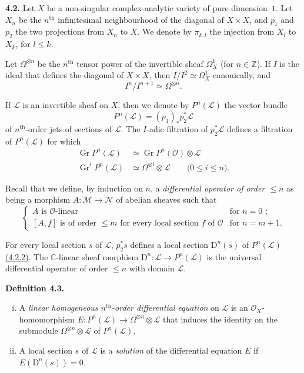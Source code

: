 \documentclass{report}
\newenvironment{rmenv}[1]
  {\phantomsection\par\medskip\noindent\textbf{#1.}\rmfamily}
  {\medskip}
\newcommand{\scr}[1]{{\mathscr{#1}}}
\renewcommand{\cal}[1]{{\mathcal{#1}}}
\newcommand{\CC}{\mathbb{C}}
\newcommand{\ZZ}{\mathbb{Z}}
\newcommand{\DD}{\mathrm{D}}
\renewcommand{\leq}{\leqslant}
\DeclareMathOperator{\Gr}{Gr}
\newcommand{\oldpage}[1]{\marginpar{\footnotesize$\Big\vert$ \textit{p.~#1}}}
\begin{document}
\begin{rmenv}{4.2}
\label{I.4.2}
  Let $X$ be a non-singular complex-analytic variety of pure dimension~$1$.
  Let $X_n$ be the $n^\mathrm{th}$ infinitesimal neighbourhood of the diagonal of $X\times X$, and $p_1$ and $p_2$ the two projections from $X_n$ to $X$.
  We denote by $\pi_{k,l}$ the injection from $X_l$ to
\oldpage{24}
  $X_k$, for $l\leq k$.

  Let $\Omega^{\otimes n}$ be the $n^\mathrm{th}$ tensor power of the invertible sheaf $\Omega_X^1$ (for $n\in\ZZ$).
  If $I$ is the ideal that defines the diagonal of $X\times X$, then $I/I^2\simeq\Omega_X^1$ canonically, and
  \[
  \label{I.4.2.1}
    I^n/I^{n+1} \simeq \Omega^{\otimes n}.
  \tag{4.2.1}
  \]

  If $\scr{L}$ is an invertible sheaf on $X$, then we denote by $P^n(\scr{L})$ the vector bundle
  \[
  \label{I.4.2.2}
    P^n(\scr{L}) = (p_1)_*p_2^*\scr{L}
  \tag{4.2.2}
  \]
  of $n^\mathrm{th}$-order jets of sections of $\scr{L}$.
  The $I$-adic filtration of $p_2^*\scr{L}$ defines a filtration of $P^n(\scr{L})$ for which
  \[
  \label{I.4.2.3}
    \begin{aligned}
      \Gr P^n(\scr{L}) &\simeq \Gr P^n(\cal{O})\otimes\scr{L}
    \\\Gr^i P^n(\scr{L}) &\simeq \Omega^{\otimes i}\otimes\scr{L} \qquad\mbox{($0\leq i\leq n$).}
    \end{aligned}
  \tag{4.2.3}
  \]

  Recall that we define, by induction on $n$, a \emph{differential operator of order $\leq n$} as being a morphism $A\colon\scr{M}\to\scr{N}$ of abelian sheaves such that
  \[
    \begin{cases}
      \mbox{$A$ is $\cal{O}$-linear} & \mbox{for $n=0$ ;}
    \\\mbox{$[A,f]$ is of order $\leq m$ for every local section $f$ of $\cal{O}$} & \mbox{for $n=m+1$.}
    \end{cases}
  \]

  For every local section $s$ of $\scr{L}$, $p_2^*s$ defines a local section $\DD^n(s)$ of $P^n(\scr{L})$ \hyperref[I.4.2.2]{(4.2.2)}.
  The $\CC$-linear sheaf morphism $\DD^n\colon\scr{L}\to P^n(\scr{L})$ is the universal differential operator of order $\leq n$ with domain $\scr{L}$.
\end{rmenv}

\begin{rmenv}{Definition 4.3}
\label{I.4.3}
  \begin{enumerate}[(i)]
    \item A \emph{linear homogeneous $n^\mathrm{th}$-order differential equation} on $\scr{L}$ is an $\cal{O}_X$-homomorphism $E\colon P^n(\scr{L})\to\Omega^{\otimes n}\otimes\scr{L}$ that induces the identity on the submodule $\Omega^{\otimes n}\otimes\scr{L}$ of $P^n(\scr{L})$.
    \item A local section $s$ of $\scr{L}$ is a \emph{solution} of the differential equation $E$ if $E(\DD^n(s))=0$.
  \end{enumerate}
\end{rmenv}
\end{document}
